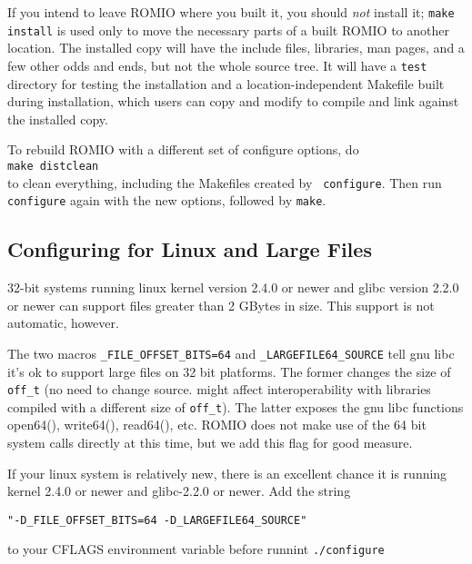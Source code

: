 If you intend to leave ROMIO where you built it, you should {\it not}
install it; {\tt make install} is used only to move the necessary
parts of a built ROMIO to another location. The installed copy will
have the include files, libraries, man pages, and a few other odds and
ends, but not the whole source tree.  It will have a {\tt test}
directory for testing the installation and a location-independent
Makefile built during installation, which users can copy and modify to
compile and link against the installed copy.

To rebuild ROMIO with a different set of configure options, do\\
\hspace*{.4in} {\tt make distclean}\\
to clean everything, including the Makefiles created by {\tt
configure}.  Then run {\tt configure} again with the new options,
followed by {\tt make}.

\subsection{Configuring for Linux and Large Files }

32-bit systems running linux kernel version 2.4.0 or newer and glibc
version 2.2.0 or newer can support files greater than 2 GBytes in size.
This support is not automatic, however.  

The two macros {\tt\_FILE\_OFFSET\_BITS=64} and
{\tt\_LARGEFILE64\_SOURCE} tell gnu libc it's ok to support large files
on 32 bit platforms.  The former changes the size of {\tt off\_t} (no
need to change source.  might affect interoperability with libraries
compiled with a different size of {\tt off\_t}).   The latter exposes
the gnu libc functions open64(), write64(), read64(), etc.   ROMIO does
not make use of the 64 bit system calls directly at this time, but we
add this flag for good measure.  

If your linux system is relatively new, there is an excellent chance it
is running kernel 2.4.0 or newer and glibc-2.2.0 or newer.  Add the
string
\begin{verbatim}
"-D_FILE_OFFSET_BITS=64 -D_LARGEFILE64_SOURCE"
\end{verbatim}
to your CFLAGS environment variable before runnint {\tt./configure}

%
%
